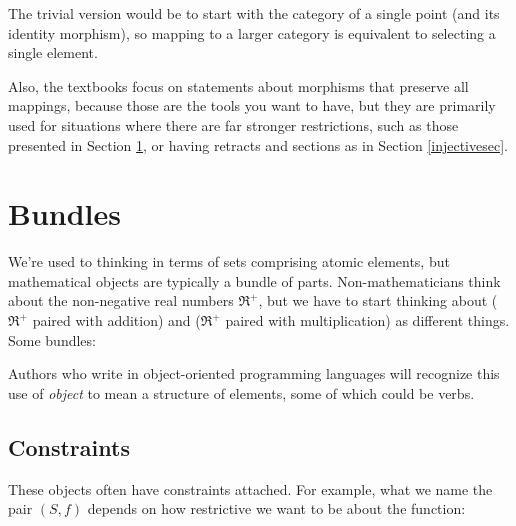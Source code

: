 \documentclass[11pt]{article}
\begin{document}
The trivial version would be to start with the category of a single point (and its
identity morphism), so mapping to a larger category is equivalent to selecting a single
element.

Also, the textbooks focus on statements about morphisms that preserve all mappings,
because those are the tools you want to have, but they are primarily used for situations
where there are far stronger restrictions, such as those presented in Section
\ref{bundlesec}, or having retracts and sections as in Section \ref{injectivesec}.

\section{Bundles}\label{bundlesec}
We're used to thinking in terms of sets comprising atomic elements, but mathematical
objects are typically a bundle of parts. Non-mathematicians think about the non-negative real numbers
$\Re^+$, but we have to start thinking about ($\Re^+$ paired with addition) and ($\Re^+$
paired with multiplication) as different things. Some bundles:


Authors who write in object-oriented programming languages will recognize this
use of {\em object} to mean a structure of elements, some of which could be verbs.

\subsection{Constraints}
These objects often have constraints attached. For example, what we name the pair $(S, f)$ depends on
how restrictive we want to be about the function:

\end{document}
